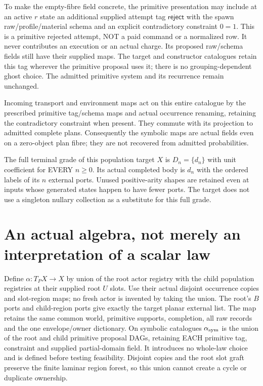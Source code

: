 \documentclass[11pt]{article}
\begin{document}
To make the empty-fibre field concrete, the primitive presentation may include at an active $r$ state an additional supplied attempt tag $\mathsf{reject}$ with the spawn raw/profile/material schema and an explicit contradictory constraint $0=1$. This is a primitive rejected attempt, NOT a paid command or a normalized row. It never contributes an execution or an actual charge. Its proposed raw/schema fields still have their supplied maps. The target and constructor catalogues retain this tag wherever the primitive proposal uses it; there is no grouping-dependent ghost choice. The admitted primitive system and its recurrence remain unchanged.

Incoming transport and environment maps act on this entire catalogue by the prescribed primitive tag/schema maps and actual occurrence renaming, retaining the contradictory constraint when present. They commute with its projection to admitted complete plans. Consequently the symbolic maps are actual fields even on a zero-object plan fibre; they are not recovered from admitted probabilities.

The full terminal grade of this population target $X$ is $D_n=\{d_n\}$ with unit coefficient for EVERY $n\geq0$. Its actual completed body is $d_n$ with the ordered labels of its $n$ external ports. Unused positive-arity shapes are retained even at inputs whose generated states happen to have fewer ports. The target does not use a singleton nullary collection as a substitute for this full grade.

\section{An actual algebra, not merely an interpretation of a scalar law}
Define $\alpha:T_PX\to X$ by union of the root actor registry with the child population registries at their supplied root $U$ slots. Use their actual disjoint occurrence copies and slot-region maps; no fresh actor is invented by taking the union. The root's $B$ ports and child-region ports give exactly the target planar external list. The map retains the same common world, primitive supports, completion, all raw records and the one envelope/owner dictionary. On symbolic catalogues $\alpha_{\rm sym}$ is the union of the root and child primitive proposal DAGs, retaining EACH primitive tag, constraint and supplied partial-domain field. It introduces no whole-law choice and is defined before testing feasibility. Disjoint copies and the root slot graft preserve the finite laminar region forest, so this union cannot create a cycle or duplicate ownership.
\end{document}

